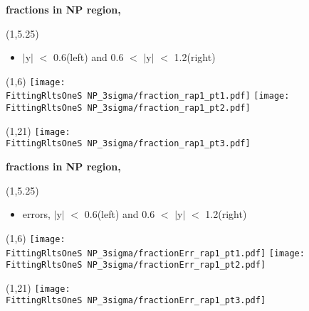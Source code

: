 \documentclass[11pt,slidescentered,red,compress,handout,hyperref={bookmarks=true},mathseriftable]{beamer}
\newcommand{\FittingRltsOneS}{../Psi1S/Fit/parameter/evaluateCtau/}
\begin{document}
\begin{frame}[t]{\small \bf fractions in NP region,  }{}
\begin{textblock}{48}(1,5.25)
\begin{itemize}
\scriptsize \item  $|$y$|$ $<$ 0.6(left) and 0.6 $<$ $|$y$|$ $<$ 1.2(right)
\end{itemize}
\end{textblock}
\begin{textblock}{48}(1,6)
\hspace*{10pt} \texttt{[image: \\FittingRltsOneS NP\_3sigma/fraction\_rap1\_pt1.pdf]}
\hspace*{10pt} \texttt{[image: \\FittingRltsOneS NP\_3sigma/fraction\_rap1\_pt2.pdf]}
\begin{textblock}{48}(1,21)
\hspace*{10pt} \texttt{[image: \\FittingRltsOneS NP\_3sigma/fraction\_rap1\_pt3.pdf]}
\end{textblock}
\end{textblock}
\end{frame}

\begin{frame}[t]{\small \bf fractions in NP region,  }{}
\begin{textblock}{48}(1,5.25)
\begin{itemize}
\scriptsize \item  errors, $|$y$|$ $<$ 0.6(left) and 0.6 $<$ $|$y$|$ $<$ 1.2(right)
\end{itemize}
\end{textblock}
\begin{textblock}{48}(1,6)
\hspace*{10pt} \texttt{[image: \\FittingRltsOneS NP\_3sigma/fractionErr\_rap1\_pt1.pdf]}
\hspace*{10pt} \texttt{[image: \\FittingRltsOneS NP\_3sigma/fractionErr\_rap1\_pt2.pdf]}
\begin{textblock}{48}(1,21)
\hspace*{10pt} \texttt{[image: \\FittingRltsOneS NP\_3sigma/fractionErr\_rap1\_pt3.pdf]}
\end{textblock}
\end{textblock}
\end{frame}
\end{document}
